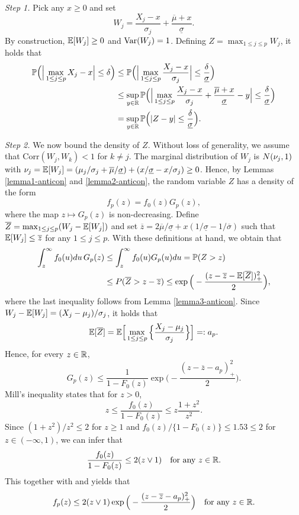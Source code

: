 \documentclass[a4paper,12pt]{article}
\makeatletter
\renewcommand{\eqref}[1]{\tagform@{\ref{#1}}}
\makeatother
\begin{document}
\textit{Step 1.} %
Pick any $x \ge 0$ and set 
\[ W_j = \frac{X_j - x}{\sigma_j} + \frac{\overline{\mu} + x}{\underline{\sigma}}. \]
By construction, $\mathbb{E}[W_j] \ge 0$ and $\textnormal{Var}(W_j) = 1$. Defining $Z = \max_{1 \le j \le p} W_j$, it holds that  
\begin{align*}
\mathbb{P} \Big( \Big| \max_{1 \le j \le p} X_j - x \Big| \le \delta \Big) 
 & \le \mathbb{P} \Big( \Big| \max_{1 \le j \le p} \frac{X_j - x}{\sigma_j} \Big| \le \frac{\delta}{\underline{\sigma}} \Big) \\
 & \le \sup_{y \in \mathbb{R}} \mathbb{P} \Big( \Big| \max_{1 \le j \le p} \frac{X_j - x}{\sigma_j} + \frac{\overline{\mu} + x}{\underline{\sigma}} - y \Big| \le \frac{\delta}{\underline{\sigma}} \Big) \\
 & = \sup_{y \in \mathbb{R}} \mathbb{P} \Big( |Z - y| \le \frac{\delta}{\underline{\sigma}} \Big). 
\end{align*}


\textit{Step 2.} We now bound the density of $Z$. Without loss of generality, we assume that $\text{Corr}(W_j,W_k) < 1$ for $k \ne j$. The marginal distribution of $W_j$ is $N(\nu_j,1)$ with $\nu_j = \mathbb{E}[W_j] = (\mu_j/\sigma_j + \overline{\mu}/{\underline{\sigma}}) + (x/\underline{\sigma} - x/\sigma_j) \ge 0$. Hence, by Lemmas \ref{lemma1-anticon} and \ref{lemma2-anticon}, the random variable $Z$ has a density of the form
\begin{equation}\label{eq-dens-Z}
f_p(z) = f_0(z) G_p(z), 
\end{equation}
where the map $z \mapsto G_p(z)$ is non-decreasing. Define $\overline{Z} = \max_{1 \le j \le p} (W_j - \mathbb{E}[W_j])$ and set $\overline{z} = 2 \overline{\mu}/\underline{\sigma} + x(1/\underline{\sigma} - 1/\overline{\sigma})$ such that $\mathbb{E}[W_j] \le \overline{z}$ for any $1 \le j \le p$. With these definitions at hand, we obtain that  
\begin{align*}
\int_z^{\infty} f_0(u)du \, G_p(z) & \le \int_z^{\infty} f_0(u) G_p(u) du = \mathbb{P}(Z > z) \\ 
 & \le P(\overline{Z} > z - \overline{z}) \le \exp \Big( - \frac{(z - \overline{z} - \mathbb{E}[\overline{Z}])^2_+}{2} \Big), 
\end{align*}
where the last inequality follows from Lemma \ref{lemma3-anticon}. Since $W_j - \mathbb{E}[W_j] = (X_j - \mu_j)/\sigma_j$, it holds that 
\[ \mathbb{E}[\overline{Z}] = \mathbb{E} \Big[ \max_{1 \le j \le p} \Big\{ \frac{X_j-\mu_j}{\sigma_j} \Big\} \Big] =: a_p. \]
Hence, for every $z \in \mathbb{R}$, 
\begin{equation}\label{eq-bound-Gp}
G_p(z) \le \frac{1}{1 - F_0(z)} \exp\Big( - \frac{(z - \overline{z} - a_p)_+^2}{2} \Big). 
\end{equation}
Mill's inequality states that for $z > 0$, 
\[ z \le \frac{f_0(z)}{1-F_0(z)} \le z \frac{1+z^2}{z^2}. \]
Since $(1+z^2)/z^2 \le 2$ for $z \ge 1$ and $f_0(z)/\{1-F_0(z)\} \le 1.53 \le 2$ for $z \in (-\infty,1)$, we can infer that
\[ \frac{f_0(z)}{1-F_0(z)} \le 2 (z \vee 1) \quad \text{for any } z \in \mathbb{R}. \]
This together with \eqref{eq-dens-Z} and \eqref{eq-bound-Gp} yields that
\[ f_p(z) \le 2 (z \vee 1)  \exp\Big( - \frac{(z - \overline{z} - a_p)_+^2}{2} \Big) \quad \text{for any } z \in \mathbb{R}. \]
 
\end{document}
